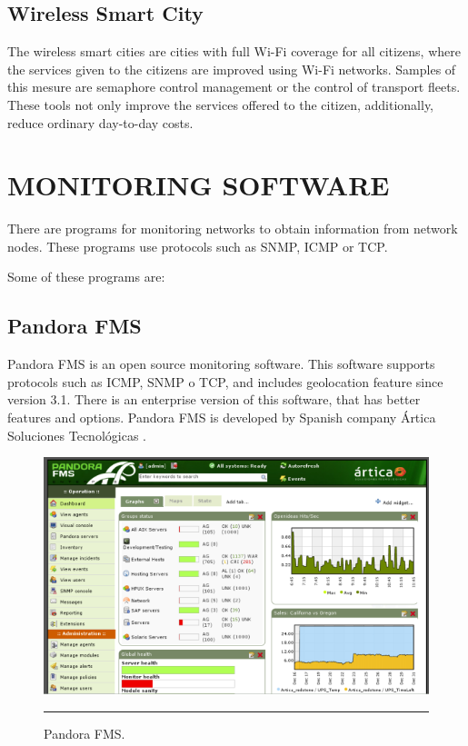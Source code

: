 \documentclass[12pt, a4paper,twoside]{tesi_upf}
\begin{document}
\subsection{Wireless Smart City}
The wireless smart cities are cities with full Wi-Fi coverage for all citizens, where the services given to the citizens are improved using Wi-Fi networks. Samples of this mesure are semaphore control management or the control of transport fleets. These tools not only improve the services offered to the citizen, additionally, reduce ordinary day-to-day costs.

\section{MONITORING SOFTWARE}

There are programs for monitoring networks to obtain information from network nodes. These programs use protocols such as SNMP, ICMP or TCP. 

Some of these programs are:
\subsection{Pandora FMS}
Pandora FMS is an open source monitoring software. This software supports protocols such as ICMP, SNMP o TCP, and includes geolocation feature since version 3.1. There is an enterprise version of this software, that has better features and options. Pandora FMS is developed by Spanish company Ártica Soluciones Tecnológicas \cite{pandorafms}.

        \begin{figure}[H]
          \centering
              \includegraphics[scale=0.9]{./figures/PandoraFMS.png}
              \rule{32em}{0.5pt}
          \caption[Pandora FMS]{Pandora FMS.}
          \label{fig:Pandora}
        \end{figure}
\end{document}
